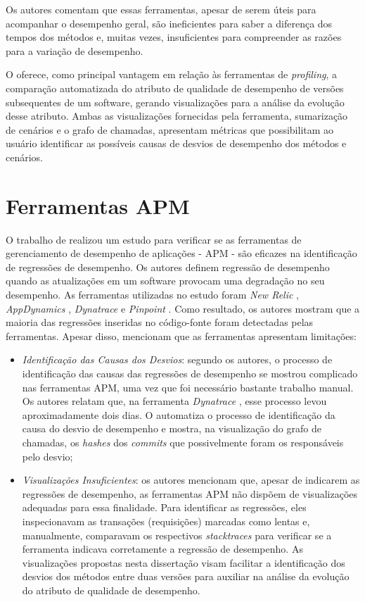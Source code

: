 Os autores comentam que essas ferramentas, apesar de serem úteis para acompanhar o desempenho geral, são ineficientes para saber a diferença dos tempos dos métodos e, muitas vezes, insuficientes para compreender as razões para a variação de desempenho.

O {\textit{\toolName}} oferece, como principal vantagem em relação às ferramentas de \textit{profiling}, a comparação automatizada do atributo de qualidade de desempenho de versões subsequentes de um software, gerando visualizações para a análise da evolução desse atributo. Ambas as visualizações fornecidas pela ferramenta, sumarização de cenários e o grafo de chamadas, apresentam métricas que possibilitam ao usuário identificar as possíveis causas de desvios de desempenho dos métodos e cenários.

\section{Ferramentas APM} \label{sec:trabalhos-relacionados-ferramentas-apm}

O trabalho de \citeauthor{Ahmed2016} realizou um estudo para verificar se as ferramentas de gerenciamento de desempenho de aplicações - APM - são eficazes na identificação de regressões de desempenho. Os autores definem regressão de desempenho quando as atualizações em um software provocam uma degradação no seu desempenho. As ferramentas utilizadas no estudo foram \textit{New Relic} \cite{Relic2016}, \textit{AppDynamics} \cite{Appdynamics}, \textit{Dynatrace} \cite{Dynatrace2016} e \textit{Pinpoint} \cite{Pinpoint2016}. Como resultado, os autores mostram que a maioria das regressões inseridas no código-fonte foram detectadas pelas ferramentas. Apesar disso, \citeauthor{Ahmed2016} mencionam que as ferramentas apresentam limitações:
\begin{itemize}
   \item \textit{Identificação das Causas dos Desvios}: segundo os autores, o processo de identificação das causas das regressões de desempenho se mostrou complicado nas ferramentas APM, uma vez que foi necessário bastante trabalho manual. Os autores relatam que, na ferramenta \textit{Dynatrace} \cite{Dynatrace2016}, esse processo levou aproximadamente dois dias. O {\textit{\toolName}} automatiza o processo de identificação da causa do desvio de desempenho e mostra, na visualização do grafo de chamadas, os \textit{hashes} dos \textit{commits} que possivelmente foram os responsáveis pelo desvio;   
   \item \textit{Visualizações Insuficientes}: os autores mencionam que, apesar de indicarem as regressões de desempenho, as ferramentas APM não dispõem de visualizações adequadas para essa finalidade. Para identificar as regressões, eles inspecionavam as transações (requisições) marcadas como lentas e, manualmente, comparavam os respectivos \textit{stacktraces} para verificar se a ferramenta indicava corretamente a regressão de desempenho. As visualizações propostas nesta dissertação visam facilitar a identificação dos desvios dos métodos entre duas versões para auxiliar na análise da evolução do atributo de qualidade de desempenho.
\end{itemize}

